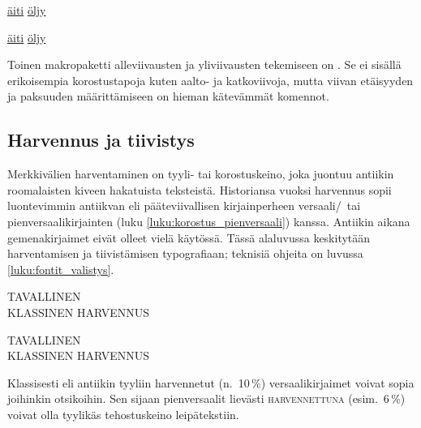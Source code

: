\begin{koodilohkosis}
  \setlength{\ULdepth}{.2ex}        %
  \renewcommand{\ULthickness}{.1ex} %
  \uline{äiti} \uline{öljy}
\end{koodilohkosis}

\begin{tulossis}
  \setlength{\ULdepth}{.2ex}
  \renewcommand{\ULthickness}{.1ex}
  \uline{äiti} \uline{öljy}
\end{tulossis}

Toinen makropaketti alleviivausten ja yliviivausten tekemiseen on
. Se ei sisällä erikoisempia korostustapoja
kuten aalto- ja katkoviivoja, mutta viivan etäisyyden ja paksuuden
määrittämiseen on hieman kätevämmät komennot.

\subsection{Harvennus ja tiivistys}
\label{luku:korostus_harvennus}

Merkkivälien harventaminen on tyyli- tai korostuskeino, joka juontuu
antiikin roomalaisten kiveen hakatuista teksteistä. Historiansa vuoksi
harvennus sopii luontevimmin antiikvan eli pääteviivallisen
kirjainperheen versaali\-/\ tai pienversaalikirjainten (luku
\ref{luku:korostus_pienversaali}) kanssa. Antiikin aikana
gemenakirjaimet eivät olleet vielä käytössä. Tässä alaluvussa
keskitytään harventamisen ja tiivistämisen typografiaan; teknisiä
ohjeita on luvussa \ref{luku:fontit_valistys}.

\begin{koodilohkosis}
  \large TAVALLINEN \\
  { KLASSINEN HARVENNUS}
\end{koodilohkosis}

\begin{tulossis}
  \large
  TAVALLINEN \\
  { KLASSINEN HARVENNUS}
\end{tulossis}

Klassisesti eli antiikin tyyliin harvennetut (n.~10\,\%)
versaalikirjaimet voivat sopia joihinkin otsikoihin. Sen sijaan
pienversaalit lievästi {
  \textsc{harvennettuna}} (esim.~6\,\%) voivat olla tyylikäs
tehostuskeino leipätekstiin.

